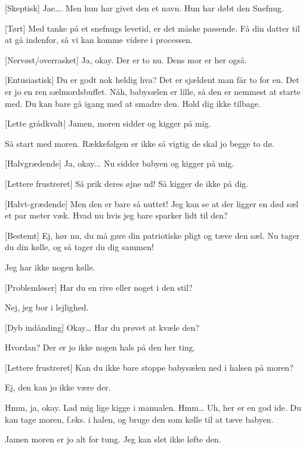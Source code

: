 \documentclass[a4paper,11pt]{article}
\begin{document}
\begin{sketch}
[Skeptisk] Jae…. Men hun har givet den et navn. Hun har døbt den Snefnug. 

[Tørt] Med tanke på et snefnugs levetid, er det måske passende. Få din datter til at gå indenfor, så vi kan komme videre i processen.

[Nervøst/overrasket] Ja, okay. Der er to nu. Dens mor er her også.

[Entusiastisk] Du er godt nok heldig hva? Det er sjældent man får to for en. Det er jo en ren sælmordsbuffet. Nåh, babysælen er lille, så den er nemmest at starte med. Du kan bare gå igang med at smadre den. Hold dig ikke tilbage.

[Lette grådkvalt] Jamen, moren sidder og kigger på mig.

 Så start med moren. Rækkefølgen er ikke så vigtig de skal jo begge to dø.

[Halvgrædende] Ja, okay...  Nu sidder babyen og kigger på mig.

[Lettere frustreret] Så prik deres øjne ud! Så kigger de ikke på dig. 

[Halvt-grædende] Men den er bare så nuttet! Jeg kan se at der ligger en død sæl et par meter væk. Hvad nu hvis jeg bare sparker lidt til den?

[Bestemt] Ej, hør nu, du må gøre din patriotiske pligt og tæve den sæl. Nu tager du din kølle, og så tager du dig sammen!


  Jeg har ikke nogen kølle.

[Problemløser] Har du en rive eller noget i den stil?

 Nej, jeg bor i lejlighed.

[Dyb indånding] Okay… Har du prøvet at kvæle den?

 Hvordan? Der er jo ikke nogen hals på den her ting.

[Lettere frustreret] Kan du ikke bare stoppe babysælen ned i halsen på moren?

 Ej, den kan jo ikke være der.

 Hmm, ja, okay. Lad mig lige kigge i manualen.  Hmm… Uh, her er en god ide. Du kan tage moren, f.eks. i halen, og bruge den som kølle til at tæve babyen. 

 Jamen moren er jo alt for tung. Jeg kan slet ikke løfte den.


\end{sketch}
\end{document}
